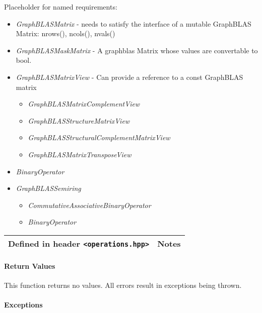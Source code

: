 Placeholder for named requirements:

\begin{itemize}
\item \emph{GraphBLASMatrix} - needs to satisfy the interface of a mutable GraphBLAS Matrix: nrows(), ncols(), nvals()
\item \emph{GraphBLASMaskMatrix} - A graphblas Matrix whose values are convertable to bool.
\item \emph{GraphBLASMatrixView} - Can provide a reference to a const GraphBLAS matrix
    \begin{itemize}
    \item \emph{GraphBLASMatrixComplementView}
    \item \emph{GraphBLASStructureMatrixView}
    \item \emph{GraphBLASStructuralComplementMatrixView}
    \item \emph{GraphBLASMatrixTransposeView}
    \end{itemize}
\item \emph{BinaryOperator}
\item \emph{GraphBLASSemiring}
    \begin{itemize}
    \item \emph{CommutativeAssociativeBinaryOperator}
    \item \emph{BinaryOperator}
    \end{itemize}
\end{itemize}

\begin{tabularx}{\textwidth}{X l}
Defined in header \texttt{<operations.hpp>}  &  \textbf{Notes} \\
\hline
\end{tabularx}

\paragraph{Return Values}

This function returns no values.  All errors result in exceptions being thrown.


\paragraph{Exceptions}


